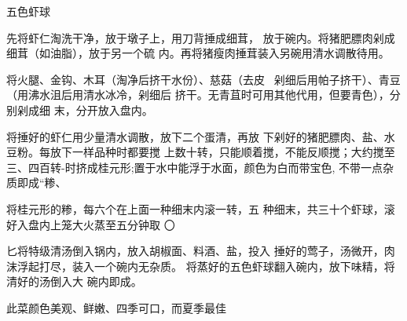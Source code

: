\begin{recipe}{五色虾球}

\ingredients



\cooking

\step 先将虾仁淘洗干净，放于墩子上，用刀背捶成细茸， 放于碗内。将猪肥膘肉剁成细茸（如油脂），放于另一个硫 内。再将猪瘦肉捶茸装入另碗用清水调散待用。

\step 将火腿、金钩、木耳（淘净后挤干水份）、慈菇（去皮~ 剁细后用帕子挤干）、青豆（用沸水沮后用清水冰冷，剁细后 挤干。无青苴时可用其他代用，但要青色），分别剁成细 末，分开放入盘内。

将捶好的虾仁用少量清水调散，放下二个蛋清，再放 下剁好的猪肥膘肉、盐、水豆粉。每放下一样品种时都要搅 上数十转，只能顺着搅，不能反顺搅；大约搅至三、四百转-时挤成桂元形;置于水中能浮于水面，颜色为白而带宝色, 不带一点杂质即成“糁、

将桂元形的糁，每六个在上面一种细末内滚一转，五 种细末，共三十个虾球，滚好入盘内上笼大火蒸至五分钟取 〇

匕将特级清汤倒入锅内，放入胡椒面、料酒、盐，投入 捶好的莺子，汤微开，肉沫浮起打尽，装入一个碗内无杂质。 将蒸好的五色虾球翻入碗内，放下味精，将清好的汤倒入大 碗内即成。

\notes

此菜颜色美观、鲜嫩、四季可口，而夏季最佳

\end{recipe}

